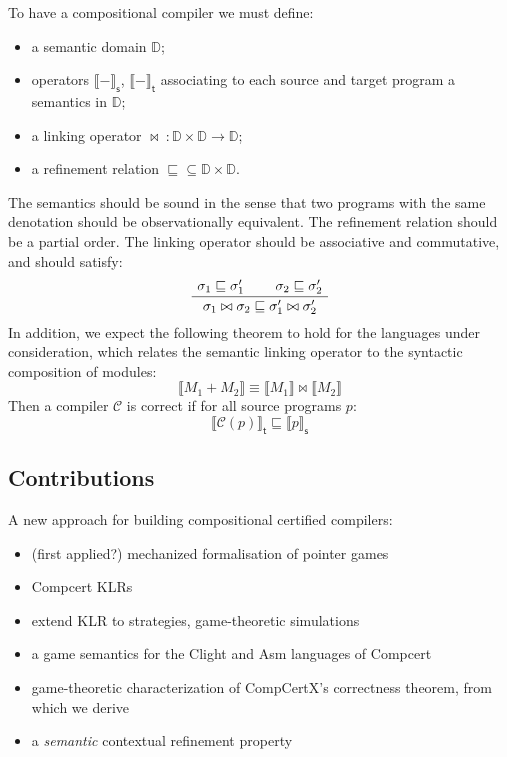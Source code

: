 \documentclass[acmsmall,anonymous]{acmart}
\newcommand{\kw}[1]{\ensuremath{ \textsf{#1} }}
\begin{document}
To have a compositional compiler we must define:
\begin{itemize}
\item a semantic domain $\mathbb{D}$;
\item operators $\llbracket - \rrbracket_\kw{s}$, $\llbracket - \rrbracket_\kw{t}$
  associating to each source and target program a semantics in $\mathbb{D}$;
\item a linking operator $\bowtie \: : \mathbb{D} \times \mathbb{D} \rightarrow \mathbb{D}$;
\item a refinement relation ${\sqsubseteq} \subseteq \mathbb{D} \times \mathbb{D}$.
\end{itemize}
The semantics should be sound in the sense that
two programs with the same denotation should be observationally equivalent.
The refinement relation should be a partial order.
The linking operator should be associative and commutative,
and should satisfy:
\[
  \AxiomC{$\sigma_1 \sqsubseteq \sigma_1'$}
  \AxiomC{$\sigma_2 \sqsubseteq \sigma_2'$}
  \BinaryInfC{$\sigma_1 \bowtie \sigma_2 \sqsubseteq \sigma_1' \bowtie \sigma_2'$}
  \DisplayProof
\]
In addition,
we expect the following theorem to hold
for the languages under consideration,
which relates the semantic linking operator to
the syntactic composition of modules:
\[
  \llbracket M_1 + M_2 \rrbracket \equiv
  \llbracket M_1 \rrbracket \bowtie \llbracket M_2 \rrbracket
\]
Then a compiler $\mathcal{C}$ is correct if
for all source programs $p$:
\[
  \llbracket \mathcal{C}(p) \rrbracket_\kw{t} \sqsubseteq
  \llbracket p \rrbracket_\kw{s}
\]

\subsection{Contributions}

A new approach for building compositional certified compilers:
\begin{itemize}
\item (first applied?) mechanized formalisation of pointer games
\item Compcert KLRs
\item extend KLR to strategies, game-theoretic simulations
\item a game semantics for the Clight and Asm languages of Compcert
\item game-theoretic characterization of CompCertX's correctness theorem, from which we derive
\item a \emph{semantic} contextual refinement property
\end{itemize}
\end{document}
